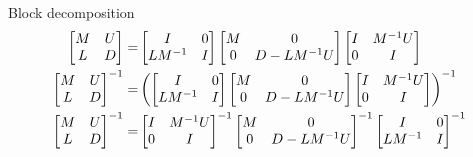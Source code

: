 Block decomposition
\begin{align*}
    \begin{bmatrix}
        M & U \\
        L & D
    \end{bmatrix}
    =&
    \begin{bmatrix}
        I & 0 \\
        L M^{-1} & I
    \end{bmatrix}
    \begin{bmatrix}
        M & 0 \\
        0 & D-L M^{-1} U
    \end{bmatrix}
    \begin{bmatrix}
        I & M^{-1} U \\
        0 & I
    \end{bmatrix}
    \\
     \begin{bmatrix}
        M & U \\
        L & D
    \end{bmatrix}
    ^{-1}
    =&
    \L(
    \begin{bmatrix}
        I & 0 \\
        L M^{-1} & I
    \end{bmatrix}
    \begin{bmatrix}
        M & 0 \\
        0 & D-L M^{-1} U
    \end{bmatrix}
    \begin{bmatrix}
        I & M^{-1} U \\
        0 & I
    \end{bmatrix}
    \R)^{-1}
    \\
     \begin{bmatrix}
        M & U \\
        L & D
    \end{bmatrix}
    ^{-1}
    =&
    \begin{bmatrix}
        I & M^{-1} U \\
        0 & I
    \end{bmatrix}
    ^{-1}
    \begin{bmatrix}
        M & 0 \\
        0 & D-L M^{-1} U
    \end{bmatrix}
    ^{-1}
    \begin{bmatrix}
        I & 0 \\
        L M^{-1} & I
    \end{bmatrix}
    ^{-1}

\end{align*}

